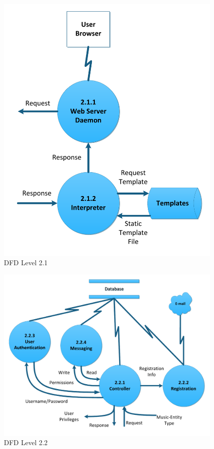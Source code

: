 \documentclass[letterpaper,12pt]{article}
\begin{document}
{\begin{figure}[h!]
\centering
\includegraphics[scale=0.6]{DFD_level_2_1.pdf}
\caption{DFD Level 2.1}
\label{fig:DFD_level_2.1}
\end{figure}

\eject

\begin{figure}[h]
\centering
\includegraphics[scale=0.6]{DFD_level_2_2.pdf}
\caption{DFD Level 2.2}
\label{fig:DFD_level_2.2}
\end{figure}

}
\end{document}
